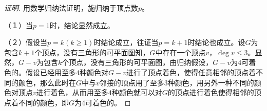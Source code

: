 \begin{proof}[证明]
    用数学归纳法证明，施归纳于顶点数$p$。

    （１）当$p=1$时，结论显然成立。

    （２）假设当$p=k(k\geq 1)$时结论成立，往证当$p=k+1$时结论也成立。设$G$为包含$k+1$个顶点，没有三角形的可平面图知，$G$中存在一个顶点$v$，$\deg v \leq 3$。显然，$G-v$为包含$k$个顶点，没有三角形的可平面图，由归纳假设，$G-v$为$4$可着色的。假设已经用至多$4$种颜色对$G-v$进行了顶点着色，使得任意相邻的顶点着不同的颜色，那么此时在$G$中与$v$邻接的顶点用了至多$3$种颜色，用另外一种不同的颜色对顶点$v$进行着色，从而用至多$4$种颜色就可以对$G$的顶点进行着色使得相邻的顶点着不同的颜色，即$G$为$4$可着色的。
\end{proof}
